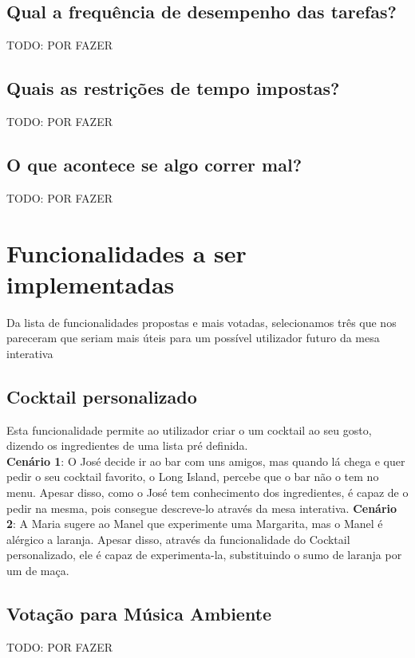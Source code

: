 \documentclass{article}
\begin{document}
\subsection*{Qual a frequência de desempenho das tarefas?}
TODO: POR FAZER
\subsection*{Quais as restrições de tempo impostas?}
TODO: POR FAZER
\subsection*{O que acontece se algo correr mal?}
TODO: POR FAZER
\\

\section*{Funcionalidades a ser implementadas}

Da lista de funcionalidades propostas e mais votadas, selecionamos três que nos pareceram que seriam mais úteis para um possível utilizador futuro da mesa interativa

\subsection*{Cocktail personalizado}
Esta funcionalidade permite ao utilizador criar o um cocktail ao seu gosto, dizendo os ingredientes de uma lista pré definida.\\
\textbf{Cenário 1}: O José decide ir ao bar com uns amigos, mas quando lá chega e quer pedir o seu cocktail favorito, o Long Island, percebe que o bar não o tem no menu. Apesar disso, como o José tem conhecimento dos ingredientes, é capaz de o pedir na mesma, pois consegue descreve-lo através da mesa interativa.
\textbf{Cenário 2}: A Maria sugere ao Manel que experimente uma Margarita, mas o Manel é alérgico a laranja. Apesar disso, através da funcionalidade do Cocktail personalizado, ele é capaz de experimenta-la, substituindo o sumo de laranja por um de maça.
\\

\subsection{Votação para Música Ambiente}
TODO: POR FAZER

\subsection{}
\end{document}
